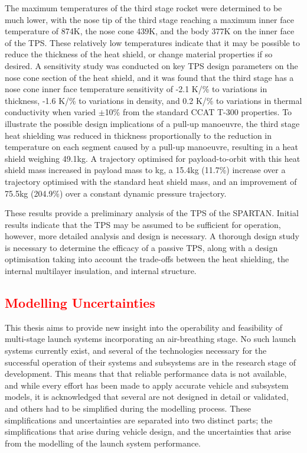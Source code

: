 The maximum temperatures of the third stage rocket were determined to be much lower, with the nose tip of the third stage reaching a maximum inner face temperature of 874K, the nose cone  439K, and the body 377K on the inner face of the TPS. These relatively low temperatures indicate that it may be possible to reduce the thickness of the heat shield, or change material properties if so desired. A sensitivity study was conducted on key TPS design parameters on the nose cone section of the heat shield, and it was found that the third stage has a nose cone inner face temperature sensitivity of -2.1 K/\% to variations in thickness, -1.6 K/\% to variations in density, and 0.2 K/\% to variations in thermal conductivity when varied $\pm$10\% from the standard CCAT T-300 properties. To illustrate the possible design implications of a pull-up manoeuvre, the third stage heat shielding was reduced in thickness proportionally to the reduction in temperature on each segment caused by a pull-up manoeuvre, resulting in a heat shield weighing 49.1kg. A trajectory optimised for payload-to-orbit with this heat shield mass increased in payload mass to \PayloadToOrbitTPSreduced kg, a 15.4kg (11.7\%) increase over a trajectory optimised with the standard heat shield mass, and an improvement of 75.5kg (204.9\%) over a constant dynamic pressure trajectory. 

These results provide a preliminary analysis of the TPS of the SPARTAN. Initial results indicate that the TPS may be assumed to be sufficient for operation, however, more detailed analysis and design is necessary. A thorough design study is necessary to determine the efficacy of a passive TPS, along with a design optimisation taking into account the trade-offs between the heat shielding, the internal multilayer insulation, and internal structure. 


\textcolor{red}{
\chapter{Modelling Uncertainties}
}



This thesis aims to provide new insight into the operability and feasibility of multi-stage launch systems incorporating an air-breathing stage.
No such launch systems currently exist, and several of the technologies necessary for the successful operation of their systems and subsystems are in the research stage of development.
This means that that reliable performance data is not available, and while every effort has been made to apply accurate vehicle and subsystem models, it is acknowledged that several are not designed in detail or validated, and others had to be simplified during the modelling process. 
These simplifications and uncertainties are separated into two distinct parts; the simplifications that arise during vehicle design, and the uncertainties that arise from the modelling of the launch system performance. 

